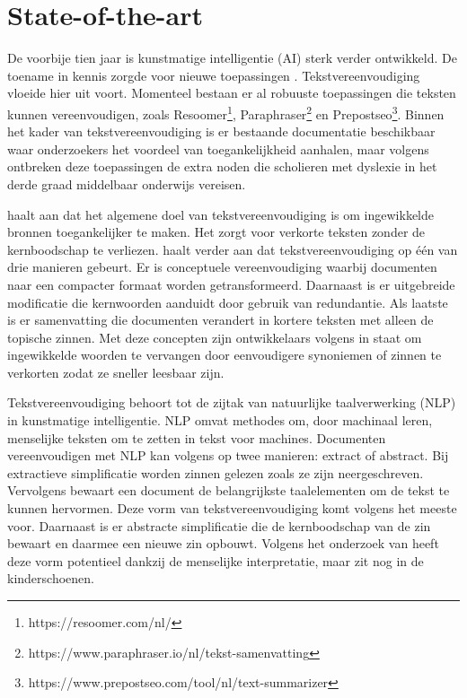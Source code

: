 

\section{State-of-the-art}%
\label{sec:state-of-the-art}

De voorbije tien jaar is kunstmatige intelligentie (AI) sterk verder ontwikkeld. De toename in kennis zorgde voor nieuwe toepassingen \autocite{Vasista2022}. Tekstvereenvoudiging vloeide hier uit voort. Momenteel bestaan er al robuuste toepassingen die teksten kunnen vereenvoudigen, zoals Resoomer\footnote{https://resoomer.com/nl/}, Paraphraser\footnote{https://www.paraphraser.io/nl/tekst-samenvatting} en Prepostseo\footnote{https://www.prepostseo.com/tool/nl/text-summarizer}. Binnen het kader van tekstvereenvoudiging is er bestaande documentatie beschikbaar waar onderzoekers het voordeel van toegankelijkheid aanhalen, maar volgens \textcite{Gooding2022} ontbreken deze toepassingen de extra noden die scholieren met dyslexie in het derde graad middelbaar onderwijs vereisen.

\textcite{Shardlow2014} haalt aan dat het algemene doel van tekstvereenvoudiging is om ingewikkelde bronnen toegankelijker te maken. Het zorgt voor verkorte teksten zonder de kernboodschap te verliezen. \textcite{Siddharthan2014} haalt verder aan dat tekstvereenvoudiging op één van drie manieren gebeurt. Er is conceptuele vereenvoudiging waarbij documenten naar een compacter formaat worden getransformeerd. Daarnaast is er uitgebreide modificatie die kernwoorden aanduidt door gebruik van redundantie. Als laatste is er samenvatting die documenten verandert in kortere teksten met alleen de topische zinnen. Met deze concepten zijn ontwikkelaars volgens \textcite{Siddharthan2014} in staat om ingewikkelde woorden te vervangen door eenvoudigere synoniemen of zinnen te verkorten zodat ze sneller leesbaar zijn.

Tekstvereenvoudiging behoort tot de zijtak van natuurlijke taalverwerking (NLP) in kunstmatige intelligentie. NLP omvat methodes om, door machinaal leren, menselijke teksten om te zetten in tekst voor machines. Documenten vereenvoudigen met NLP kan volgens \textcite{Chowdhary2020} op twee manieren: extract of abstract. Bij extractieve simplificatie worden zinnen gelezen zoals ze zijn neergeschreven. Vervolgens bewaart een document de belangrijkste taalelementen om de tekst te kunnen hervormen. Deze vorm van tekstvereenvoudiging komt volgens \autocite{Sciforce2020} het meeste voor. Daarnaast is er abstracte simplificatie die de kernboodschap van de zin bewaart en daarmee een nieuwe zin opbouwt. Volgens het onderzoek van \textcite{Chowdhary2020} heeft deze vorm potentieel dankzij de menselijke interpretatie, maar zit nog in de kinderschoenen.

